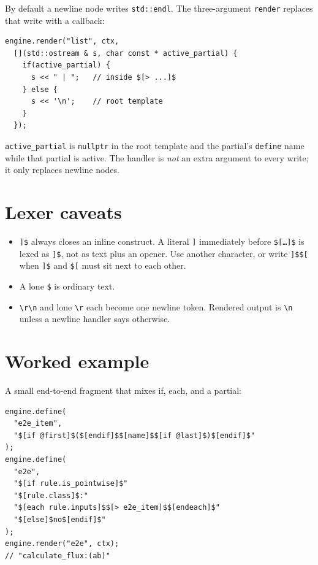 \documentclass[11pt,letterpaper]{article}
\newcommand{\api}[1]{\texttt{#1}}
\begin{document}
By default a newline node writes \api{std::endl}. The three-argument
\api{render} replaces that write with a callback:

\begin{lstlisting}
engine.render("list", ctx,
  [](std::ostream & s, char const * active_partial) {
    if(active_partial) {
      s << " | ";   // inside $[> ...]$
    } else {
      s << '\n';    // root template
    }
  });
\end{lstlisting}

\api{active\_partial} is \texttt{nullptr} in the root template and the
partial's \api{define} name while that partial is active. The handler is
\emph{not} an extra argument to every write; it only replaces newline nodes.

\section{Lexer caveats}

\begin{itemize}
  \item \texttt{]\$} always closes an inline construct. A literal
        \texttt{]} immediately before \texttt{\$[\ldots]\$} is lexed as
        \texttt{]\$}, not as text plus an opener. Use another character, or
        write \texttt{]\$\$[} when \texttt{]\$} and \texttt{\$[} must sit
        next to each other.
  \item A lone \texttt{\$} is ordinary text.
  \item \texttt{\textbackslash r\textbackslash n} and lone \texttt{\textbackslash r}
        each become one newline token. Rendered output is \texttt{\textbackslash n}
        unless a newline handler says otherwise.
\end{itemize}

\section{Worked example}

A small end-to-end fragment that mixes if, each, and a partial:

\begin{lstlisting}
engine.define(
  "e2e_item",
  "$[if @first]$($[endif]$$[name]$$[if @last]$)$[endif]$"
);
engine.define(
  "e2e",
  "$[if rule.is_pointwise]$"
  "$[rule.class]$:"
  "$[each rule.inputs]$$[> e2e_item]$$[endeach]$"
  "$[else]$no$[endif]$"
);
engine.render("e2e", ctx);
// "calculate_flux:(ab)"
\end{lstlisting}
\end{document}
